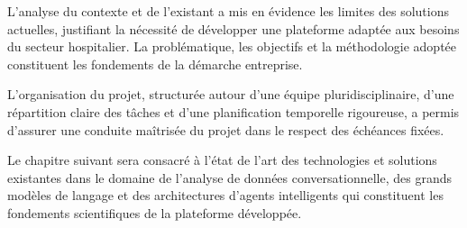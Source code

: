 L'analyse du contexte et de l'existant a mis en évidence les limites des solutions actuelles, justifiant la nécessité de développer une plateforme adaptée aux besoins du secteur hospitalier. La problématique, les objectifs et la méthodologie adoptée constituent les fondements de la démarche entreprise.

L'organisation du projet, structurée autour d'une équipe pluridisciplinaire, d'une répartition claire des tâches et d'une planification temporelle rigoureuse, a permis d'assurer une conduite maîtrisée du projet dans le respect des échéances fixées.

Le chapitre suivant sera consacré à l'état de l'art des technologies et solutions existantes dans le domaine de l'analyse de données conversationnelle, des grands modèles de langage et des architectures d'agents intelligents qui constituent les fondements scientifiques de la plateforme développée.